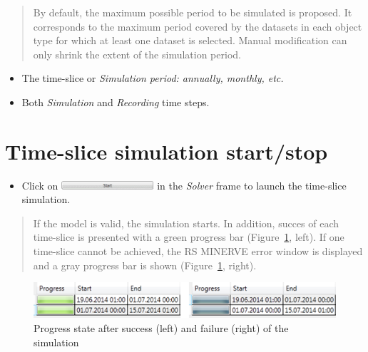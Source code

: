 \documentclass[
  letterpaper,
  DIV=11,
  numbers=noendperiod]{scrreprt}
\providecommand{\tightlist}{%
  \setlength{\itemsep}{0pt}\setlength{\parskip}{0pt}}\usepackage{longtable,booktabs,array}
\begin{document}
\begin{quote}
By default, the maximum possible period to be simulated is proposed. It
corresponds to the maximum period covered by the datasets in each object
type for which at least one dataset is selected. Manual modification can
only shrink the extent of the simulation period.
\end{quote}

\begin{itemize}
\item
  {The time-slice or \emph{Simulation period: annually, monthly, etc.}}
\item
  {Both \emph{Simulation} and \emph{Recording} time steps.}
\end{itemize}

\hypertarget{time-slice-simulation-startstop}{%
\section{Time-slice simulation
start/stop}\label{time-slice-simulation-startstop}}

\begin{itemize}
\tightlist
\item
  {Click on
  \includegraphics[width=\textwidth,height=0.12in]{./figures/fig-icon_calibrator_start.png}
  in the \emph{Solver} frame to launch the time-slice simulation.}
\end{itemize}

\begin{quote}
If the model is valid, the simulation starts. In addition, succes of
each time-slice is presented with a green progress bar
(Figure~\ref{fig-time_slice_simulation_progress_simulation}, left). If
one time-slice cannot be achieved, the RS MINERVE error window is
displayed and a gray progress bar is shown
(Figure~\ref{fig-time_slice_simulation_progress_simulation}, right).
\end{quote}

\begin{figure}

{\centering \includegraphics{./figures/fig-time_slice_simulation_progress_simulation.png}

}

\caption{\label{fig-time_slice_simulation_progress_simulation}Progress
state after success (left) and failure (right) of the simulation}

\end{figure}
\end{document}
